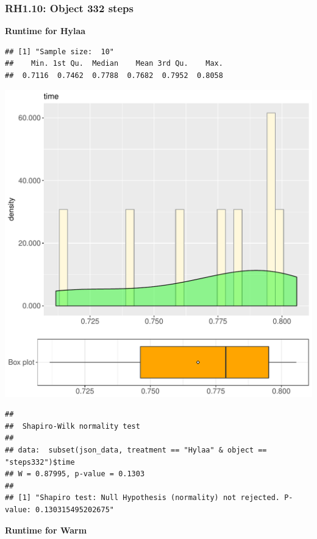 \documentclass{article}\usepackage[]{graphicx}\usepackage[]{color}
\makeatletter
\def\maxwidth{ %
  \ifdim\Gin@nat@width>\linewidth
    \linewidth
  \else
    \Gin@nat@width
  \fi
}
\newenvironment{kframe}{%
 \def\at@end@of@kframe{}%
 \ifinner\ifhmode%
  \def\at@end@of@kframe{\end{minipage}}%
  \begin{minipage}{\columnwidth}%
 \fi\fi%
 \def\FrameCommand##1{\hskip\@totalleftmargin \hskip-\fboxsep
 \colorbox{shadecolor}{##1}\hskip-\fboxsep
     \hskip-\linewidth \hskip-\@totalleftmargin \hskip\columnwidth}%
 \MakeFramed {\advance\hsize-\width
   \@totalleftmargin\z@ \linewidth\hsize
   \@setminipage}}%
 {\par\unskip\endMakeFramed%
 \at@end@of@kframe}
\newenvironment{knitrout}{}{} %
\makeatother
\begin{document}
\subsubsection{RH1.10: Object 332 steps}

 \textbf{Runtime for Hylaa}
\begin{knitrout}
\color{fgcolor}\begin{kframe}
\begin{verbatim}
## [1] "Sample size:  10"
##    Min. 1st Qu.  Median    Mean 3rd Qu.    Max. 
##  0.7116  0.7462  0.7788  0.7682  0.7952  0.8058
\end{verbatim}
\end{kframe}
\includegraphics[width=\maxwidth]{figure/RH1_Hylaa_steps332-1} 
\begin{kframe}\begin{verbatim}
## 
## 	Shapiro-Wilk normality test
## 
## data:  subset(json_data, treatment == "Hylaa" & object == "steps332")$time
## W = 0.87995, p-value = 0.1303
## 
## [1] "Shapiro test: Null Hypothesis (normality) not rejected. P-value: 0.130315495202675"
\end{verbatim}
\end{kframe}
\end{knitrout}
 \textbf{Runtime for Warm}
\end{document}
